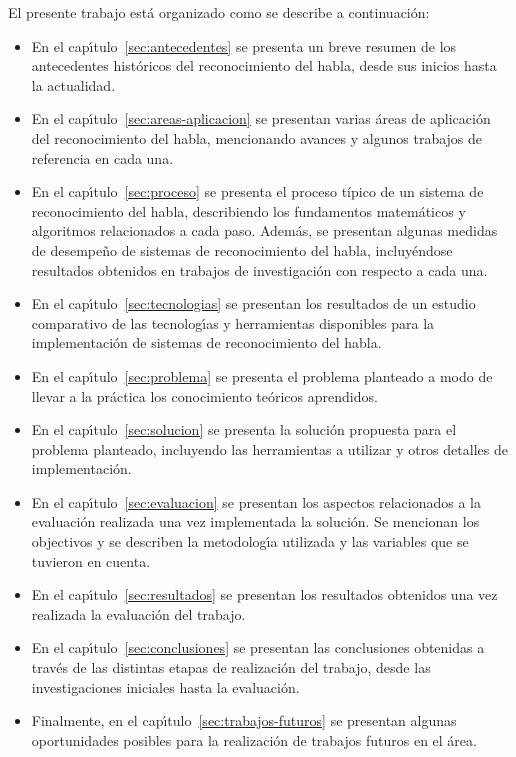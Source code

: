 El presente trabajo est\'a organizado como se describe a continuaci\'on:

\begin{itemize}
    \item En el cap{\'\i}tulo~\ref{sec:antecedentes} se presenta un breve resumen de los antecedentes hist\'oricos del reconocimiento
	del habla, desde sus inicios hasta la actualidad.
    \item En el cap{\'\i}tulo~\ref{sec:areas-aplicacion} se presentan varias \'areas de aplicaci\'on del reconocimiento del habla, 
	mencionando avances y algunos trabajos de referencia en cada una.
    \item En el cap{\'\i}tulo~\ref{sec:proceso} se presenta el proceso t\'{i}pico de un sistema de reconocimiento del habla,
	describiendo los fundamentos matem\'aticos y algoritmos relacionados a cada paso. Adem\'as, se presentan algunas 
    medidas de desempe\~no de sistemas de reconocimiento del
	habla, incluy\'endose resultados obtenidos en trabajos de investigaci\'on con respecto a cada una.
    \item En el cap{\'\i}tulo~\ref{sec:tecnologias} se presentan los resultados de un estudio comparativo de las tecnolog{\'\i}as
	y herramientas disponibles para la implementaci\'on de sistemas de reconocimiento del habla.
    \item En el cap{\'\i}tulo~\ref{sec:problema} se presenta el problema planteado a modo de llevar a la pr\'actica los
	conocimiento te\'oricos aprendidos.
    \item En el cap{\'\i}tulo~\ref{sec:solucion} se presenta la soluci\'on propuesta para el problema planteado, incluyendo
	las herramientas a utilizar y otros detalles de implementaci\'on.
    \item En el cap{\'\i}tulo~\ref{sec:evaluacion} se presentan los aspectos relacionados a la evaluaci\'on realizada una vez
	implementada la soluci\'on. Se mencionan los objectivos y se describen la metodolog{\'\i}a utilizada
	y las variables que se tuvieron en cuenta.
    \item En el cap{\'\i}tulo~\ref{sec:resultados} se presentan los resultados obtenidos una vez realizada la evaluaci\'on
	del trabajo.
    \item En el cap{\'\i}tulo~\ref{sec:conclusiones} se presentan las conclusiones obtenidas a trav\'es de las distintas
	etapas de realizaci\'on del trabajo, desde las investigaciones iniciales hasta la evaluaci\'on.
    \item Finalmente, en el cap{\'\i}tulo~\ref{sec:trabajos-futuros} se presentan algunas oportunidades
    posibles para la realizaci\'on de trabajos futuros en el \'area.
\end{itemize}